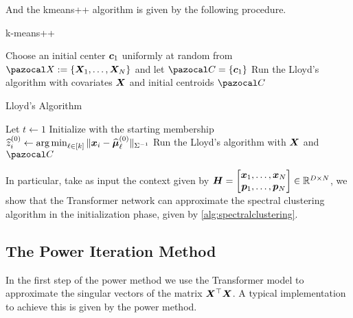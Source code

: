 And the kmeans++ algorithm is given by the following procedure.
\begin{algorithm}[htbp] 
 \caption{k-means++}
\label{alg:kmeans++}
Choose an initial center $\boldsymbol{c}_1$ uniformly at random from $\ca X:=\{\bfa X_1,\ldots,\bfa X_N\}$ and let $\ca C=\{\bfa c_1\}$\;
Run the Lloyd's algorithm with covariates $\boldsymbol{X}$ and initial centroids $\ca C$\;
\end{algorithm}
\begin{algorithm}[htbp] 
 \caption{Lloyd's Algorithm}
\label{alg:lloyd}
Let $t\gets 1$\;
Initialize with the starting membership $\widehat{z}_i^{(0)}\gets\operatorname*{arg\,min}_{\ell\in[k]}\Vert \boldsymbol{x}_i-\widehat{\boldsymbol{\mu}}_\ell^{(0)}\Vert_{\Sigma^{-1}}$\;
Run the Lloyd's algorithm with $\boldsymbol{X}$ and $\ca C$\;
\end{algorithm}

In particular, take as input the context given by $\boldsymbol{H}=\begin{bmatrix}
    \boldsymbol{x}_1,\ldots,\boldsymbol{x}_N\\
    \boldsymbol{p}_1,\ldots,\boldsymbol{p}_N
\end{bmatrix}\in\mathbb{R}^{D\times N}$, we show that the Transformer network can approximate the spectral clustering algorithm in the initialization phase, given by \ref{alg:spectralclustering}.
\subsection{The Power Iteration Method}
In the first step of the power method 
we use the Transformer model to approximate the singular vectors of the matrix $\boldsymbol{X}^\top\boldsymbol{X}$. A typical implementation to achieve this is given by the power method.


